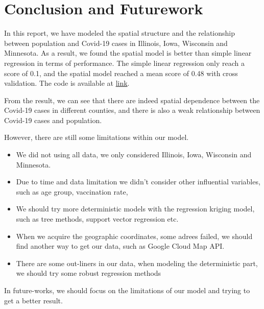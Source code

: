 \documentclass{article}
\begin{document}
\section{Conclusion and Futurework}
In this report, we have modeled the spatial structure and the relationship between population and Covid-19 cases in Illinois, Iowa, Wisconsin and Minnesota. As a result, we found the spatial model is better than simple linear regression in terms of performance. The simple linear regression only reach a score of 0.1, and the spatial model reached a mean score of 0.48 with cross validation. The code is available at \href{https://github.com/Rexzhang99/Covid-19-Cases-Spatial-Prediction}{link}. 

From the result, we can see that there are indeed spatial dependence between the Covid-19 cases in different counties, and there is also a weak relationship between Covid-19 cases and population. 

However, there are still some limitations within our model. 
\begin{itemize}
    \item We did not using all data, we only considered Illinois, Iowa, Wisconsin and Minnesota.
    \item Due to time and data limitation we didn't consider other influential variables, such as age group, vaccination rate, 
    \item We should try more deterministic models with the regression kriging model, such as tree methods, support vector regression etc.
    \item When we acquire the geographic coordinates, some adrees  failed, we should find another way to get our data, such as Google Cloud Map API. 
    \item There are some out-liners in our data, when modeling the deterministic part, we should try some robust regression methods
\end{itemize}
In future-works, we should focus on the limitations of our model and trying to get a better result.  





\end{document}
